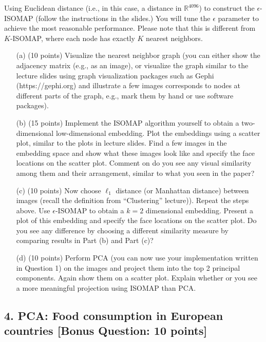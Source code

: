 \documentclass[twoside,10pt]{article}
\begin{document}
Using Euclidean distance (i.e., in this case, a distance in $\mathbb R^{4096}$) to construct the $\epsilon$-ISOMAP (follow the instructions in the slides.) You will tune the $\epsilon$ parameter to achieve the most reasonable performance. Please note that this is different from $K$-ISOMAP, where each node has exactly $K$ nearest neighbors.

\begin{enumerate} 

\item[(a)] (10 points) Visualize the nearest neighbor graph (you can either show the adjacency matrix (e.g., as an image), or visualize the graph similar to the lecture slides using graph visualization packages such as Gephi (\textsf{https://gephi.org}) and illustrate a few images corresponds to nodes at different parts of the graph, e.g., mark them by hand or use software packages).
 
\item[(b)] (15 points) Implement the ISOMAP algorithm yourself to obtain a two-dimensional low-dimensional embedding. Plot the embeddings using a scatter plot, similar to the plots in lecture slides. Find a few images in the embedding space and show what these images look like and specify the face locations on the scatter plot. Comment on do you see any visual similarity among them and their arrangement, similar to what you seen in the paper?

\item[(c)] (10 points) Now choose $\ell_1$ distance (or Manhattan distance) between images (recall the definition from ``Clustering'' lecture)). Repeat the steps above. Use $\epsilon$-ISOMAP to obtain a $k=2$ dimensional embedding. Present a plot of this embedding and specify the face locations on the scatter plot. Do you see any difference by choosing a different similarity measure by comparing results in Part (b) and Part (c)? 

\item[(d)] (10 points) Perform PCA (you can now use your implementation written in Question 1) on the images and project them into the top 2 principal components. Again show them on a scatter plot. Explain whether or you see a more meaningful projection using ISOMAP than PCA. 

\end{enumerate}

\clearpage

\subsection*{4. PCA: Food consumption in European countries [Bonus Question: 10 points]}
\end{document}

